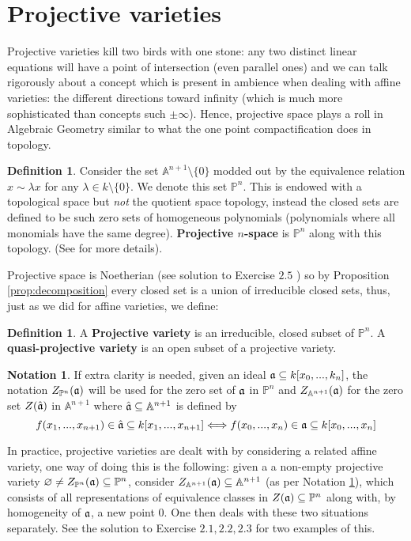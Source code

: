 \documentclass[12pt]{article}
\theoremstyle{plain}
\theoremstyle{definition}
\newtheorem{defn}[thm]{Definition} %
\newtheorem{notation}[thm]{Notation}
\newcommand{\bb}[1]{\mathbb{#1}}
\begin{document}
\section{Projective varieties}
Projective varieties kill two birds with one stone: any two distinct linear equations will have a point of intersection (even parallel ones) and we can talk rigorously about a concept which is present in ambience when dealing with affine varieties: the different directions toward infinity (which is much more sophisticated than concepts such $\pm \infty$). Hence, projective space plays a roll in Algebraic Geometry similar to what the one point compactification does in topology.
%
\begin{defn}
Consider the set $\bb{A}^{n+1}\setminus\lbrace 0 \rbrace$ modded out by the equivalence relation $x \sim \lambda x$ for any $\lambda \in k\setminus \lbrace 0 \rbrace$. We denote this set $\bb{P}^n$. This is endowed with a topological space but \emph{not} the quotient space topology, instead the closed sets are defined to be such zero sets of homogeneous polynomials (polynomials where all monomials have the same degree). \textbf{Projective $n$-space} is $\bb{P}^n$ along with this topology. (See \cite{hartshorne} for more details).
\end{defn}
Projective space is Noetherian (see solution to Exercise $2.5$ \cite{hartshorne_solutions}) so by Proposition \ref{prop:decomposition} every closed set is a union of irreducible closed sets, thus, just as we did for affine varieties, we define:
\begin{defn}
A \textbf{Projective variety} is an irreducible, closed subset of $\bb{P}^n$. A \textbf{quasi-projective variety} is an open subset of a projective variety.
\end{defn}
\begin{notation}\label{notation:affine_proj}
If extra clarity is needed, given an ideal $\frak{a} \subseteq k[x_0,...,k_n]$, the notation $Z_{\bb{P}^n}(\frak{a})$ will be used for the zero set of $\frak{a}$ in $\bb{P}^n$ and $Z_{\bb{A}^{n+1}}(\frak{a})$ for the zero set $Z(\hat{\frak{a}})$ in $\bb{A}^{n+1}$ where $\hat{\frak{a}} \subseteq \bb{A}^{n+1}$ is defined by
\begin{equation}
    f(x_1,...,x_{n+1}) \in \hat{\frak{a}} \subseteq k[x_1,...,x_{n+1}] \Longleftrightarrow f(x_0,...,x_n) \in \frak{a} \subseteq k[x_0,...,x_n]
\end{equation}
\end{notation}
In practice, projective varieties are dealt with by considering a related affine variety, one way of doing this is the following: given a a non-empty projective variety $\varnothing \neq Z_{\bb{P}^n}(\frak{a}) \subseteq \bb{P}^n$, consider $Z_{\bb{A}^{n+1}}(\frak{a})\subseteq \bb{A}^{n+1}$ (as per Notation \ref{notation:affine_proj}), which consists of all representations of equivalence classes in $Z(\frak{a}) \subseteq \bb{P}^n$ along with, by homogeneity of $\frak{a}$, a new point $0$. One then deals with these two situations separately. See the solution to Exercise $2.1,2.2,2.3$ \cite{hartshorne_solutions} for two examples of this.
\end{document}
